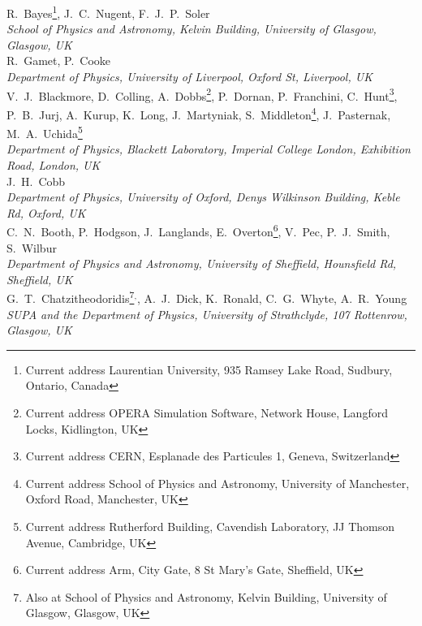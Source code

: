 R.~Bayes\footnote{Current address Laurentian University, 935 Ramsey Lake Road, Sudbury, Ontario, Canada},  J.~C.~Nugent, F.~J.~P.~Soler
\\{\it
School of Physics and Astronomy, Kelvin Building, University of Glasgow, Glasgow, UK
}\\

R.~Gamet, P.~Cooke
\\{\it
Department of Physics, University of Liverpool, Oxford St, Liverpool, UK
}\\

V.~J.~Blackmore, D.~Colling, A.~Dobbs\footnote{Current address OPERA Simulation Software, Network House, Langford Locks, Kidlington, UK}, P.~Dornan, P.~Franchini, C.~Hunt\footnote{Current address CERN, Esplanade des Particules 1, Geneva, Switzerland}, P.~B.~Jurj, A.~Kurup, K.~Long, J.~Martyniak,  S.~Middleton\footnote{Current address School of Physics and Astronomy, University of Manchester, Oxford Road, Manchester, UK}, J.~Pasternak, M.~A.~Uchida\footnote{Current address Rutherford Building, Cavendish Laboratory, JJ Thomson Avenue, Cambridge, UK}
\\{\it
Department of Physics, Blackett Laboratory, Imperial College London, Exhibition Road, London, UK
}\\

J.~H.~Cobb
\\{\it
Department of Physics, University of Oxford, Denys Wilkinson Building, Keble Rd, Oxford, UK
}\\

C.~N.~Booth, P.~Hodgson, J.~Langlands, E.~Overton\footnote{Current address Arm, City Gate, 8 St Mary's Gate, Sheffield, UK}, V.~Pec,  P.~J.~Smith, S.~Wilbur
\\{\it
Department of Physics and Astronomy, University of Sheffield, Hounsfield Rd, Sheffield, UK
}\\

G.~T.~Chatzitheodoridis\footnote{Also at School of Physics and Astronomy, Kelvin Building, University of Glasgow, Glasgow, UK}$^,$\footnotemark, A.~J.~Dick\footnotemark[\value{footnote}],  K.~Ronald\footnotemark[\value{footnote}], C.~G.~Whyte\footnotemark[\value{footnote}], A.~R.~Young\footnotemark[\value{footnote}]
\\{\it
SUPA and the Department of Physics, University of Strathclyde, 107 Rottenrow, Glasgow, UK
}\\


